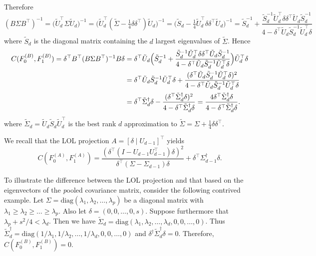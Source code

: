 \documentclass[10pt]{article}
\begin{document}
Therefore
$$ (B \Sigma B^{\top})^{-1} = \bigl(\tilde{U}_{d}^{\top} \Sigma \tilde{U}_d \bigr)^{-1} = \bigl( \tilde{U}_d^{\top} (\tilde{\Sigma} - \tfrac{1}{4} \delta \delta^{\top}) \tilde{U}_d\bigr)^{-1} = \bigl(\tilde{S}_d - \tfrac{1}{4} \tilde{U}_d^{\top} \delta \delta^{\top} \tilde{U}_d \bigr)^{-1} = \tilde{S}_d^{-1} + \frac{\tilde{S}_d^{-1} \tilde{U}_d^{\top} \delta \delta^{\top} \tilde{U}_d \tilde{S}_d^{-1}}{4 - \delta^{\top} \tilde{U}_d \tilde{S}_d^{-1} \tilde{U}_d^{\top} \delta} $$
where $\tilde{S}_d$ is the diagonal matrix containing the $d$ largest eigenvalues of $\tilde{\Sigma}$. Hence
\begin{equation}
\begin{split}
C(F_0^{(B)}, F_1^{(B)}) = \delta^{\top} B^{\top} (B \Sigma B^{\top})^{-1} B \delta & = \delta^{\top} \tilde{U}_d \Bigl(\tilde{S}_d^{-1} + \frac{\tilde{S}_d^{-1} \tilde{U}_d^{\top} \delta \delta^{\top} \tilde{U}_d \tilde{S}_d^{-1}}{4 - \delta^{\top} \tilde{U}_d \tilde{S}_d^{-1} \tilde{U}_d^{\top} \delta} \Bigr) \tilde{U}_d^{\top} \delta \\ &= \delta^{\top} \tilde{U}_d \tilde{S}_d^{-1} \tilde{U}_d^{\top} \delta + \frac{(\delta^{\top} \tilde{U}_d \tilde{S}_d^{-1} \tilde{U}_d^{\top} \delta)^{2}}{4 - \delta^{\top} \tilde{U}_d \tilde{S}_d^{-1} \tilde{U}_d^{\top} \delta} \\
&= \delta^{\top} \tilde{\Sigma}_d^{\dagger} \delta - \frac{(\delta^{\top} \tilde{\Sigma}_d^{\dagger} \delta)^2}{4 - \delta^{\top} \tilde{\Sigma}_d^{\dagger} \delta} = \frac{4 \delta^{\top} \tilde{\Sigma}_d^{\dagger} \delta}{4 - \delta^{\top} \tilde{\Sigma}_d^{\dagger} \delta}.
\end{split}
\end{equation}
where $\tilde{\Sigma}_d = \tilde{U}_d \tilde{S}_d \tilde{U}_d^{\top}$ is the best rank $d$ approximation to $\tilde{\Sigma} = \Sigma + \tfrac{1}{4} \delta \delta^{\top}$. 

We recall that the LOL projection $A = [\delta \mid U_{d-1}]^{\top}$ yields
$$ C(F_0^{(A)}, F_1^{(A)}) = \frac{(\delta^{\top} (I - U_{d-1} U_{d-1}^{\top}) \delta)^{2}}{\delta^{\top} (\Sigma - \Sigma_{d-1}) \delta} + \delta^{\top} \Sigma_{d-1}^{\dagger} \delta. $$

To illustrate the difference between the LOL projection and that based on the eigenvectors of the {\emph pooled} covariance matrix, consider the following contrived example. Let $\Sigma = \mathrm{diag}(\lambda_1, \lambda_2, \dots, \lambda_p)$ be a diagonal matrix with $\lambda_1 \geq \lambda_2 \geq \dots \geq \lambda_p$. Also let $\delta = (0,0,\dots,0,s)$. Suppose furthermore that $\lambda_p + s^{2}/4 < \lambda_d$. Then we have $\tilde{\Sigma}_d = \mathrm{diag}(\lambda_1, \lambda_2, \dots, \lambda_d, 0, 0, \dots, 0)$. Thus $\tilde{\Sigma}_d^{\dagger} = \mathrm{diag}(1/\lambda_1, 1/\lambda_2, \dots, 1/\lambda_d, 0,0, \dots, 0)$ and $\delta^{\dagger} \tilde{\Sigma}_d^{\dagger} \delta = 0$. Therefore, $C(F_0^{(B)}, F_1^{(B)}) = 0$.
\end{document}
